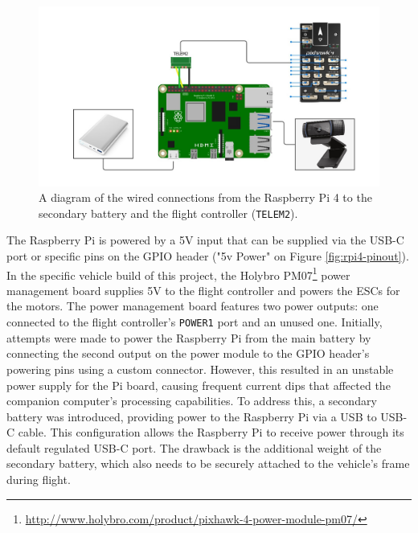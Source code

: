 \begin{figure}
  \centering
  \includegraphics[width=\textwidth,keepaspectratio]{img/wiring-diagram.jpg}
  \caption{A diagram of the wired connections from the Raspberry Pi 4 to the secondary battery and the flight controller (\texttt{TELEM2}).}
  \label{fig:wiring}
\end{figure}

The Raspberry Pi is powered by a 5V input that can be supplied via the USB-C port or specific pins on the GPIO header ("5v Power" on Figure \ref{fig:rpi4-pinout}). 
In the specific vehicle build of this project, the Holybro PM07\footnote{\url{http://www.holybro.com/product/pixhawk-4-power-module-pm07/}} power management board supplies 5V to the flight controller and powers the ESCs for the motors. 
The power management board features two power outputs: one connected to the flight controller's \texttt{POWER1} port and an unused one. 
Initially, attempts were made to power the Raspberry Pi from the main battery by connecting the second output on the power module to the GPIO header's powering pins using a custom connector. 
However, this resulted in an unstable power supply for the Pi board, causing frequent current dips that affected the companion computer's processing capabilities. 
To address this, a secondary battery was introduced, providing power to the Raspberry Pi via a USB to USB-C cable. 
This configuration allows the Raspberry Pi to receive power through its default regulated USB-C port. 
The drawback is the additional weight of the secondary battery, which also needs to be securely attached to the vehicle's frame during flight.

